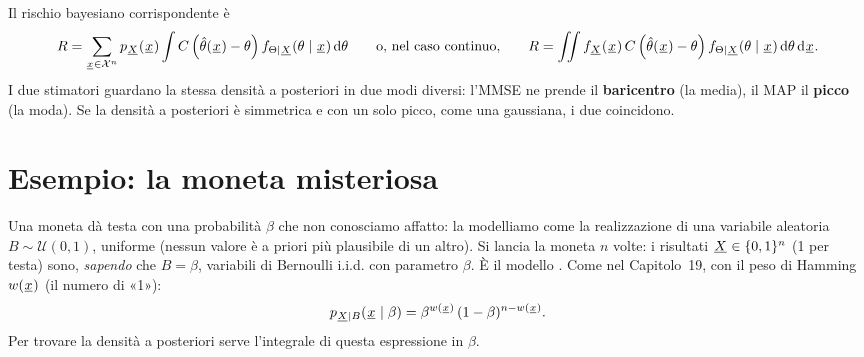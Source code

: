 Il rischio bayesiano corrispondente è
\[ R = \sum_{{\mkern1mu\underline{x}\mkern1mu} \in \mathcal{X}^n} p_{{\mkern1mu\underline{X}\mkern1mu}}({\mkern1mu\underline{x}\mkern1mu}) \int C\left( \hat\theta({\mkern1mu\underline{x}\mkern1mu}) - \theta \right)
   f_{\Theta \mid {\mkern1mu\underline{X}\mkern1mu}}(\theta \mid {\mkern1mu\underline{x}\mkern1mu}) \,\mathrm{d}\theta \qquad\text{o, nel caso continuo,}\qquad R = \iint
   f_{{\mkern1mu\underline{X}\mkern1mu}}({\mkern1mu\underline{x}\mkern1mu})\, C\left( \hat\theta({\mkern1mu\underline{x}\mkern1mu}) - \theta \right) f_{\Theta \mid {\mkern1mu\underline{X}\mkern1mu}}(\theta \mid {\mkern1mu\underline{x}\mkern1mu})
   \,\mathrm{d}\theta \,\mathrm{d}{\mkern1mu\underline{x}\mkern1mu} . \]
I due stimatori guardano la stessa densità a posteriori in due modi diversi: l'MMSE ne prende il \textbf{baricentro}
(la media), il MAP il \textbf{picco} (la moda). Se la densità a posteriori è simmetrica e con un solo picco, come una
gaussiana, i due coincidono.

\section{Esempio: la moneta misteriosa}

Una moneta dà testa con una probabilità $\beta$ che non conosciamo affatto: la modelliamo come la realizzazione di una
variabile aleatoria $B \sim \mathcal{U}(0, 1)$, uniforme (nessun valore è a priori più plausibile di un altro). Si lancia
la moneta $n$ volte: i risultati ${\mkern1mu\underline{X}\mkern1mu} \in \{0, 1\}^n$ (1 per testa) sono, \emph{sapendo} che $B = \beta$, variabili
di Bernoulli i.i.d. con parametro $\beta$. È il modello . Come nel Capitolo~19, con il peso
di Hamming $w({\mkern1mu\underline{x}\mkern1mu})$ (il numero di «1»):
\[ p_{{\mkern1mu\underline{X}\mkern1mu} \mid B}({\mkern1mu\underline{x}\mkern1mu} \mid \beta) = \beta^{w({\mkern1mu\underline{x}\mkern1mu})}\, (1 - \beta)^{n - w({\mkern1mu\underline{x}\mkern1mu})} . \]
Per trovare la densità a posteriori serve l'integrale di questa espressione in $\beta$.

